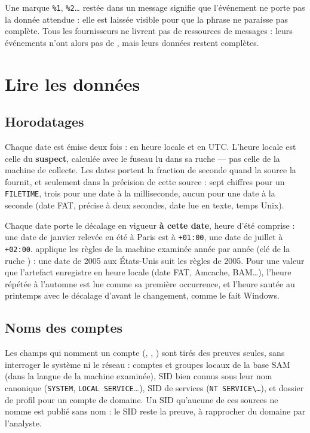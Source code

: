 \documentclass[11pt,a4paper,oneside]{report}
\begin{document}
\begin{note}
Une marque \texttt{\%1}, \texttt{\%2}\ldots{} restée dans un message signifie que
l'événement ne porte pas la donnée attendue : elle est laissée visible pour que la
phrase ne paraisse pas complète. Tous les fournisseurs ne livrent pas de
ressources de messages : leurs événements n'ont alors pas de
, mais leurs données restent complètes.
\end{note}

\chapter{Lire les données}\label{chap:lecture}

\section{Horodatages}

Chaque date est émise deux fois :  en heure locale et  en
UTC. L'heure locale est celle du \textbf{suspect}, calculée avec le fuseau lu
dans sa ruche  — pas celle de la machine de collecte. Les dates
portent la fraction de seconde quand la source la fournit, et seulement dans
la précision de cette source : sept chiffres pour un \texttt{FILETIME}, trois
pour une date à la milliseconde, aucun pour une date à la seconde (date FAT,
précise à deux secondes, date lue en texte, temps Unix).

Chaque date porte le décalage en vigueur \textbf{à cette date}, heure d'été
comprise : une date de janvier relevée en été à Paris est à \texttt{+01:00},
une date de juillet à \texttt{+02:00}. \wac{} applique les règles de la machine
examinée année par année (clé  de la ruche
) : une date de 2005 aux États-Unis suit les règles de 2005.
Pour une valeur que l'artefact enregistre en heure locale (date FAT, Amcache,
BAM…), l'heure répétée à l'automne est lue comme sa première occurrence, et
l'heure sautée au printemps avec le décalage d'avant le changement, comme le
fait Windows.

\section{Noms des comptes}

Les champs qui nomment un compte (, ,
) sont tirés des preuves seules, sans interroger le système ni le
réseau : comptes et groupes locaux de la base SAM (dans la langue de la
machine examinée), SID bien connus sous leur nom canonique
(\texttt{SYSTEM}, \texttt{LOCAL SERVICE}\ldots), SID de services
(\texttt{NT SERVICE\textbackslash\ldots}), et dossier de profil pour un
compte de domaine. Un SID qu'aucune de ces sources ne nomme est publié sans
nom : le SID reste la preuve, à rapprocher du domaine par l'analyste.
\end{document}
